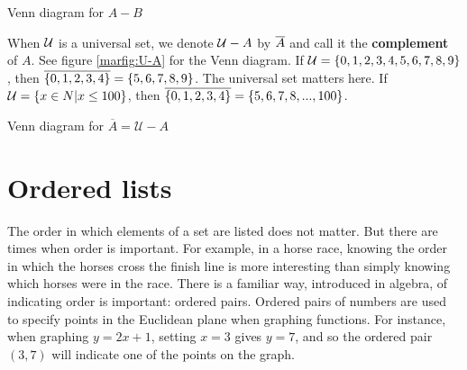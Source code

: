 \begin{marginfigure}[1.0cm]
\caption{Venn diagram for $A - B$}\label{marfig:A-B}
\end{marginfigure}



When ${\cal {U}}$ is a universal set, we denote ${\cal {U}}-A$ by $\overline{A}$ and call it the 
{ \bfseries complement} of $A$. See figure \ref{marfig:U-A} for the Venn diagram.
If ${\cal {U}}=\{0,1,2,3,4,5,6,7,8,9\}$, then $\overline{\{0,1,2,3,4\}}=\{5,6,7,8,9\}$. The universal 
set matters here.
If ${\cal {U}}=\{x\in N | x\leq 100\}$, then $\overline{\{0,1,2,3,4\}}=\{5,6,7,8,...,100\}$.

\begin{marginfigure}[1.25cm]
\caption{Venn diagram for\newline
  $\overline{A}=\mathcal{U} - A$}\label{marfig:U-A}
\end{marginfigure}

\section{Ordered lists}
The order in which elements of a set  are listed does not matter. But there are times
when order is important. For example, in a horse race, knowing the order
in which the horses cross the finish line is more interesting than simply knowing
which horses were in the race. There is a familiar way, introduced in algebra, 
of indicating order is important: ordered pairs. Ordered pairs of numbers are used to specify
points in the Euclidean plane when graphing functions. For instance, when
graphing $y=2x+1$, setting $x=3$ gives $y=7$, and so the ordered pair  $(3,7)$
will indicate one of the points on the graph. 

